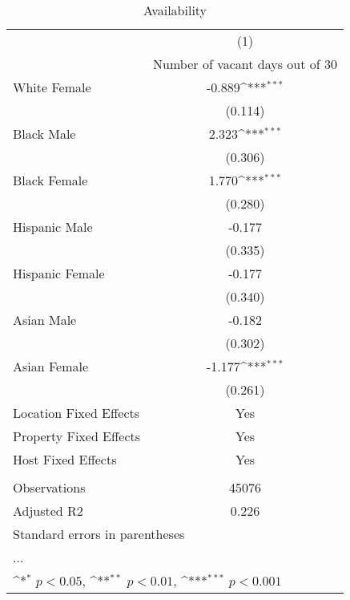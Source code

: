 \begin{table}[htbp]\centering
\def\sym#1{\ifmmode^{#1}\else\(^{#1}\)\fi}
\caption{Availability}
\begin{tabular}{l*{1}{c}}
\hline\hline
                    &\multicolumn{1}{c}{(1)}\\
                    &\multicolumn{1}{c}{Number of vacant days out of 30}\\
\hline
White Female        &      -0.889\sym{***}\\
                    &     (0.114)         \\
[1em]
Black Male          &       2.323\sym{***}\\
                    &     (0.306)         \\
[1em]
Black Female        &       1.770\sym{***}\\
                    &     (0.280)         \\
[1em]
Hispanic Male       &      -0.177         \\
                    &     (0.335)         \\
[1em]
Hispanic Female     &      -0.177         \\
                    &     (0.340)         \\
[1em]
Asian Male          &      -0.182         \\
                    &     (0.302)         \\
[1em]
Asian Female        &      -1.177\sym{***}\\
                    &     (0.261)         \\
\hline
Location Fixed Effects&         Yes         \\
Property Fixed Effects&         Yes         \\
Host Fixed Effects  &         Yes         \\
\hline \vspace{-1.25em}&                     \\
Observations        &       45076         \\
Adjusted R2         &       0.226         \\
\hline\hline
\multicolumn{2}{l}{\footnotesize Standard errors in parentheses}\\
\multicolumn{2}{l}{\footnotesize ...}\\
\multicolumn{2}{l}{\footnotesize \sym{*} \(p<0.05\), \sym{**} \(p<0.01\), \sym{***} \(p<0.001\)}\\
\end{tabular}
\end{table}
